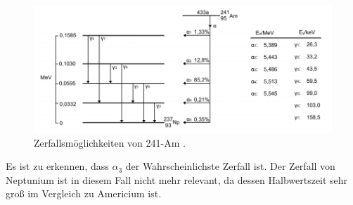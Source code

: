 \begin{figure}[H]
  \centering
  \includegraphics[width=\textwidth]{zerfall.png}
  \caption{Zerfallsmöglichkeiten von 241-Am  \cite{potsdam}.}
  \label{fig:amnp}
\end{figure}

Es ist zu erkennen, dass $\alpha_3$ der Wahrscheinlichste Zerfall ist. Der Zerfall
von Neptunium ist in diesem Fall nicht mehr relevant, da dessen Halbwertszeit
sehr groß im Vergleich zu Americium ist.
